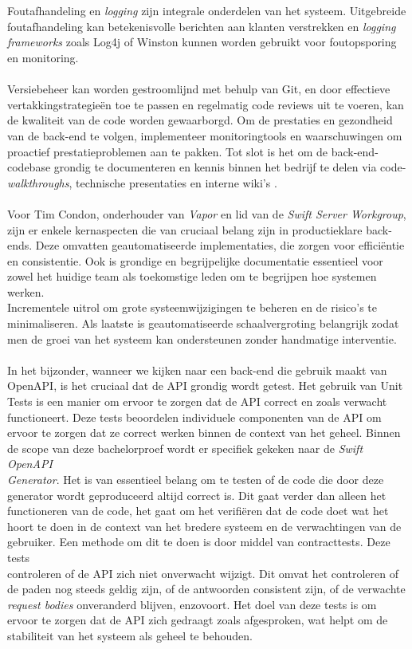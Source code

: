  \\  \\
Foutafhandeling en \textit{logging} zijn integrale onderdelen van het systeem. Uitgebreide foutafhandeling kan betekenisvolle berichten aan klanten verstrekken en \textit{logging frameworks} zoals Log4j of Winston kunnen worden gebruikt voor foutopsporing en monitoring. \\ \\Versiebeheer kan worden gestroomlijnd met behulp van Git, en door effectieve vertakkingstrategieën toe te passen en regelmatig code reviews uit te voeren, kan de kwaliteit van de code worden gewaarborgd. Om de prestaties en gezondheid van de back-end te volgen, implementeer monitoringtools en waarschuwingen om proactief prestatieproblemen aan te pakken. Tot slot is het om de back-end-codebase grondig te documenteren en kennis binnen het bedrijf te delen via code-\textit{walkthroughs}, technische presentaties en interne wiki's \autocite{Senthilkumar2023}. 
 \\  \\
Voor Tim Condon, onderhouder van \textit{Vapor} en lid van de \textit{Swift Server Workgroup}, zijn er enkele kernaspecten die van cruciaal belang zijn in productieklare back-ends. Deze omvatten geautomatiseerde implementaties, die zorgen voor efficiëntie en consistentie. Ook is grondige en begrijpelijke documentatie essentieel voor zowel het huidige team als toekomstige leden om te begrijpen hoe systemen werken.  \\Incrementele uitrol om grote systeemwijzigingen te beheren en de risico's te minimaliseren. Als laatste is geautomatiseerde schaalvergroting belangrijk zodat men de groei van het systeem kan ondersteunen zonder handmatige interventie.
 \\  \\
In het bijzonder, wanneer we kijken naar een back-end die gebruik maakt van OpenAPI, is het cruciaal dat de API grondig wordt getest. Het gebruik van Unit Tests is een manier om ervoor te zorgen dat de API correct en zoals verwacht functioneert. Deze tests beoordelen individuele componenten van de API om ervoor te zorgen dat ze correct werken binnen de context van het geheel.
Binnen de scope van deze bachelorproef wordt er specifiek gekeken naar de \textit{Swift OpenAPI \\Generator}. Het is van essentieel belang om te testen of de code die door deze \\generator wordt geproduceerd altijd correct is. Dit gaat verder dan alleen het functioneren van de code,  het gaat om het verifiëren dat de code doet wat het hoort te doen in de context van het bredere systeem en de verwachtingen van de gebruiker. Een methode om dit te doen is door middel van contracttests. Deze tests \\controleren of de API zich niet onverwacht wijzigt. Dit omvat het controleren of de paden nog steeds geldig zijn, of de antwoorden consistent zijn, of de verwachte \\\textit{request bodies} onveranderd blijven, enzovoort. Het doel van deze tests is om ervoor te zorgen dat de API zich gedraagt zoals afgesproken, wat helpt om de stabiliteit van het systeem als geheel te behouden. 

